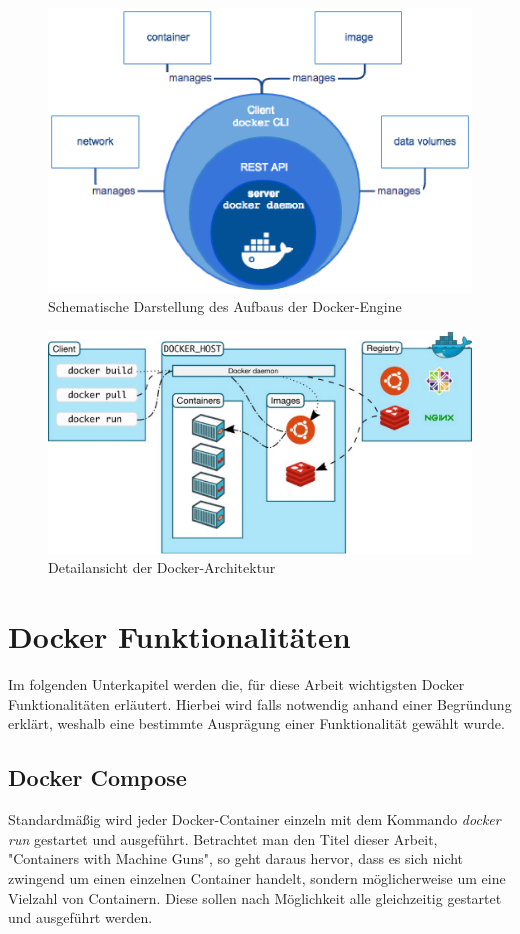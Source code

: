 \begin{figure}
	\centering
	\includegraphics[width=0.7\linewidth]{figures/DockerEngine}
	\caption[Aufbau Docker-Engine]{Schematische Darstellung des Aufbaus der Docker-Engine}
	\label{fig:dockerengine}
\end{figure}

\begin{figure}
	\centering
	\includegraphics[width=0.7\linewidth]{figures/DockerArchitecture}
	\caption[Detailansicht der Docker-Architektur]{Detailansicht der Docker-Architektur}
	\label{fig:dockerarchitecture}
\end{figure}

\section{Docker Funktionalitäten}
\label{c:funktionalität}

Im folgenden Unterkapitel werden die, für diese Arbeit wichtigsten Docker Funktionalitäten erläutert.
Hierbei wird falls notwendig anhand einer Begründung erklärt, weshalb eine bestimmte Ausprägung einer Funktionalität gewählt wurde.

\subsection{Docker Compose}

Standardmäßig wird jeder Docker-Container einzeln mit dem Kommando \textit{docker run} gestartet und ausgeführt.
Betrachtet man den Titel dieser Arbeit, "Containers with Machine Guns", so geht daraus hervor, dass es sich nicht zwingend um einen einzelnen Container handelt, sondern möglicherweise um eine Vielzahl von Containern.
Diese sollen nach Möglichkeit alle gleichzeitig gestartet und ausgeführt werden.

